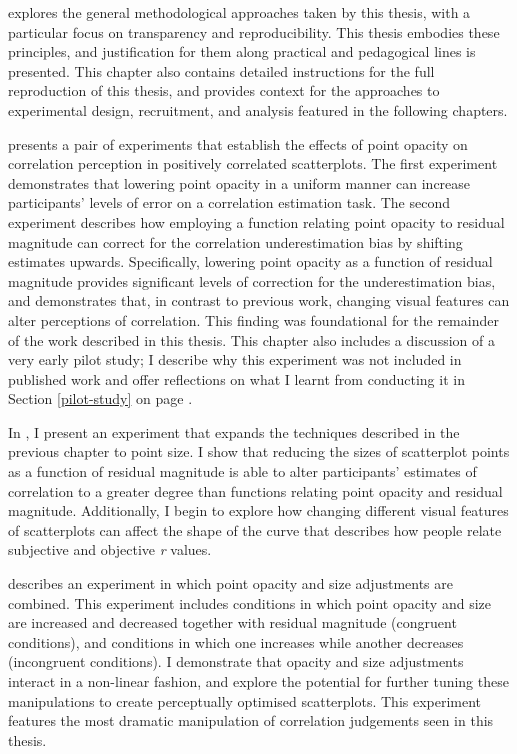 \documentclass[../main.tex]{subfiles}
\begin{document}
 explores the general methodological approaches
taken by this thesis, with a particular focus on transparency and
reproducibility. This thesis embodies these principles, and
justification for them along practical and pedagogical lines is
presented. This chapter also contains detailed instructions for the full
reproduction of this thesis, and provides context for the approaches to
experimental design, recruitment, and analysis featured in the following
chapters.

 presents a pair of experiments that
establish the effects of point opacity on correlation perception in
positively correlated scatterplots. The first experiment demonstrates
that lowering point opacity in a uniform manner can increase
participants' levels of error on a correlation estimation task. The
second experiment describes how employing a function relating point
opacity to residual magnitude can correct for the correlation
underestimation bias by shifting estimates upwards. Specifically,
lowering point opacity as a function of residual magnitude provides
significant levels of correction for the underestimation bias, and
demonstrates that, in contrast to previous work, changing visual
features can alter perceptions of correlation. This finding was
foundational for the remainder of the work described in this thesis.
This chapter also includes a discussion of a very early pilot study; I
describe why this experiment was not included in published work and
offer reflections on what I learnt from conducting it in Section
\ref{pilot-study} on page \pageref{pilot-study}.

In , I present an experiment that expands the
techniques described in the previous chapter to point size. I show that
reducing the sizes of scatterplot points as a function of residual
magnitude is able to alter participants' estimates of correlation to a
greater degree than functions relating point opacity and residual
magnitude. Additionally, I begin to explore how changing different
visual features of scatterplots can affect the shape of the curve that
describes how people relate subjective and objective \emph{r} values.

 describes an experiment in which
point opacity and size adjustments are combined. This experiment
includes conditions in which point opacity and size are increased and
decreased together with residual magnitude (congruent conditions), and
conditions in which one increases while another decreases (incongruent
conditions). I demonstrate that opacity and size adjustments interact in
a non-linear fashion, and explore the potential for further tuning these
manipulations to create perceptually optimised scatterplots. This
experiment features the most dramatic manipulation of correlation
judgements seen in this thesis.
\end{document}
